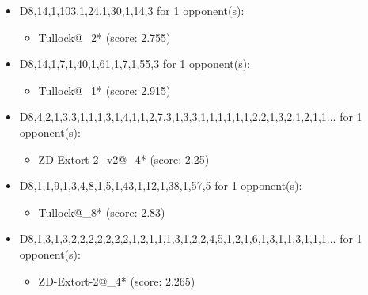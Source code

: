 \begin{appendices}
\begin{itemize}
    \item D8,14,1,103,1,24,1,30,1,14,3 for 1 opponent(s):
    \begin{multicols}{3}
         \begin{itemize}
            \item Tullock@\_2* (score: 2.755)
        \end{itemize}
     \end{multicols}
     
    \item D8,14,1,7,1,40,1,61,1,7,1,55,3 for 1 opponent(s):
    \begin{multicols}{3}
         \begin{itemize}
            \item Tullock@\_1* (score: 2.915)
        \end{itemize}
     \end{multicols}
     
    \item D8,4,2,1,3,3,1,1,1,3,1,4,1,1,2,7,3,1,3,3,1,1,1,1,1,1,2,2,1,3,2,1,2,1,1... for 1 opponent(s):
    \begin{multicols}{3}
         \begin{itemize}
            \item ZD-Extort-2\_v2@\_4* (score: 2.25)
        \end{itemize}
     \end{multicols}
     
    \item D8,1,1,9,1,3,4,8,1,5,1,43,1,12,1,38,1,57,5 for 1 opponent(s):
    \begin{multicols}{3}
         \begin{itemize}
            \item Tullock@\_8* (score: 2.83)
        \end{itemize}
     \end{multicols}
     
    \item D8,1,3,1,3,2,2,2,2,2,2,2,1,2,1,1,1,3,1,2,2,4,5,1,2,1,6,1,3,1,1,3,1,1,1... for 1 opponent(s):
    \begin{multicols}{3}
         \begin{itemize}
            \item ZD-Extort-2@\_4* (score: 2.265)
        \end{itemize}
     \end{multicols}
     

\end{itemize}
\end{appendices}
